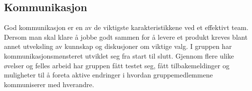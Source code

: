 \subsection{Kommunikasjon}


God kommunikasjon er en av de viktigste karakteristikkene ved et effektivt team.
Dersom man skal klare å jobbe godt sammen for å levere et produkt kreves blant annet utveksling av kunnskap og diskusjoner om viktige valg.
I gruppen har kommunikasjonsmønsteret utviklet seg fra start til slutt.
Gjennom flere ulike øvelser og felles arbeid har gruppen fått testet seg, fått tilbakemeldinger og muligheter til å foreta aktive endringer i hvordan gruppemedlemmene kommuniserer med hverandre.








